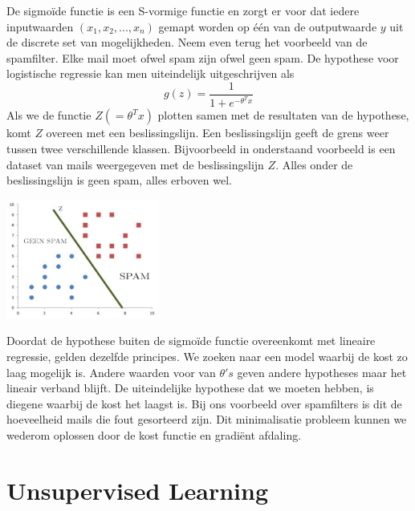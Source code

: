 De sigmo\"ide functie is een S-vormige functie en zorgt er voor dat iedere inputwaarden $(x_{1}, x_{2} , ... , x_{n})$ gemapt worden op \'e\'en van de outputwaarde $y$ uit de discrete set van mogelijkheden. Neem even terug het voorbeeld van de spamfilter. Elke mail moet ofwel spam zijn ofwel geen spam. De hypothese voor logistische regressie kan men uiteindelijk uitgeschrijven als
%
\[ g(z) = \frac{1}{1 + e^{-\theta^{T}x}} \]
%
Als we de functie $Z (= \theta^{T}x)$ plotten samen met de resultaten van de hypothese, komt $Z$ overeen met een beslissingslijn. Een beslissingslijn geeft de grens weer tussen twee verschillende klassen. 
Bijvoorbeeld in onderstaand voorbeeld is een dataset van mails weergegeven met de beslissingslijn $Z$. Alles onder de beslissingslijn is geen spam, alles erboven wel. \\
%
\begin{center}
  \includegraphics[width=5cm]{decissionline}
\end{center}
%
Doordat de hypothese buiten de sigmo\"ide functie overeenkomt met lineaire regressie, gelden dezelfde principes. We zoeken naar een model waarbij de kost zo laag mogelijk is. Andere waarden voor van $\theta's$ geven andere hypotheses maar het lineair verband blijft. De uiteindelijke hypothese dat we moeten hebben, is diegene waarbij de kost het laagst is. Bij ons voorbeeld over spamfilters is dit de hoeveelheid mails die fout gesorteerd zijn. Dit minimalisatie probleem kunnen we wederom oplossen door de kost functie en gradi\"ent afdaling.

\section{Unsupervised Learning}\label{Unsupervised Learning}

